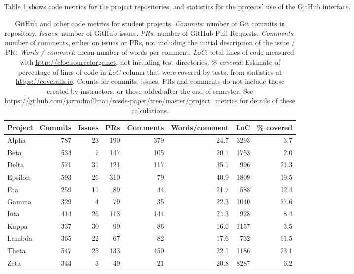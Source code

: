 Table \ref{tab:metrics} shows code metrics for the project repositories, and
statistics for the projects' use of the GitHub interface.

\begin{table}
\begin{tabular}{lrrrrrrr}
\hline
 Project   &   Commits &   Issues &   PRs &   Comments &   Words/comment &   LoC &   \% covered \\
\hline
 Alpha     &       787 &       23 &   190 &        379 &            24.7 &  3293 &         3.7 \\
 Beta      &       534 &        7 &   147 &        105 &            20.1 &  1753 &         2.0 \\
 Delta     &       571 &       31 &   121 &        117 &            35.1 &   996 &        21.3 \\
 Epsilon   &       593 &       26 &   310 &         79 &            40.9 &  1809 &        19.5 \\
 Eta       &       259 &       11 &    89 &         44 &            21.7 &   588 &        12.4 \\
 Gamma     &       329 &        4 &    79 &         35 &            22.3 &  1040 &        37.6 \\
 Iota      &       414 &       26 &   113 &        144 &            24.3 &   928 &         8.4 \\
 Kappa     &       337 &       30 &    99 &         86 &            16.6 &  1157 &         3.5 \\
 Lambda    &       365 &       22 &    67 &         82 &            17.6 &   732 &        91.5 \\
 Theta     &       547 &       25 &   133 &        450 &            22.1 &  1186 &        23.1 \\
 Zeta      &       344 &        3 &    49 &         21 &            20.8 &  8287 &         6.2 \\
\hline
\end{tabular}
\caption{GitHub and other code metrics for student projects.
    \emph{Commits}: number of Git commits in repository.
    \emph{Issues}: number of GitHub issues.
    \emph{PRs}: number of GitHub Pull Requests.
    \emph{Comments}: number of comments, either on issues or PRs, not
    including the initial description of the issue / PR.
    \emph{Words / comment}: mean number of words per comment.
    \emph{LoC}: total lines of code measured with
    \url{http://cloc.sourceforge.net}, not including test directories.
    \emph{\% covered}: Estimate of percentage of lines of code in \emph{LoC}
    column that were covered by tests, from statistics at
    \url{https://coveralls.io}.
    Counts for commits, issues, PRs and comments do not include those created
    by instructors, or those added after the end of semester. See
    \url{https://github.com/jarrodmillman/rcsds-paper/tree/master/project_metrics}
    for details of these calculations.}
\label{tab:metrics}
\end{table}

